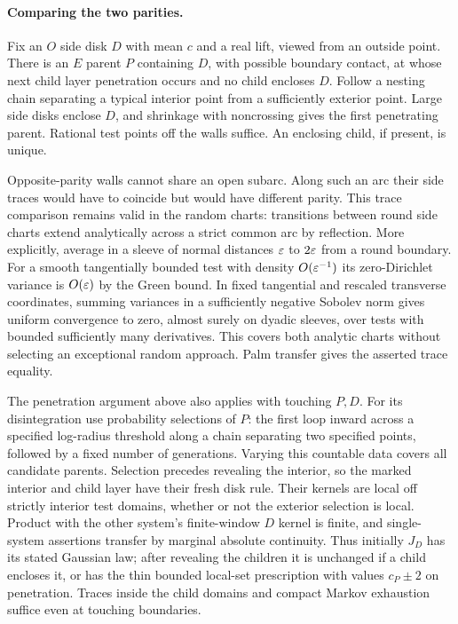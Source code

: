 \paragraph{Comparing the two parities.}
Fix an $O$ side disk $D$ with mean $c$ and a real lift, viewed from an outside point.  There is an $E$ parent $P$ containing $D$, with possible boundary contact, at whose next child layer penetration occurs and no child encloses $D$.  Follow a nesting chain separating a typical interior point from a sufficiently exterior point.  Large side disks enclose $D$, and shrinkage with noncrossing gives the first penetrating parent.  Rational test points off the walls suffice.  An enclosing child, if present, is unique.

Opposite-parity walls cannot share an open subarc.  Along such an arc their side traces would have to coincide but would have different parity.  This trace comparison remains valid in the random charts: transitions between round side charts extend analytically across a strict common arc by reflection.  More explicitly, average in a sleeve of normal distances $\varepsilon$ to $2\varepsilon$ from a round boundary.  For a smooth tangentially bounded test with density $O(\varepsilon^{-1})$ its zero-Dirichlet variance is $O(\varepsilon)$ by the Green bound.  In fixed tangential and rescaled transverse coordinates, summing variances in a sufficiently negative Sobolev norm gives uniform convergence to zero, almost surely on dyadic sleeves, over tests with bounded sufficiently many derivatives.  This covers both analytic charts without selecting an exceptional random approach.  Palm transfer gives the asserted trace equality.

The penetration argument above also applies with touching $P,D$.  For its disintegration use probability selections of $P$: the first loop inward across a specified log-radius threshold along a chain separating two specified points, followed by a fixed number of generations.  Varying this countable data covers all candidate parents.  Selection precedes revealing the interior, so the marked interior and child layer have their fresh disk rule.  Their kernels are local off strictly interior test domains, whether or not the exterior selection is local.  Product with the other system's finite-window $D$ kernel is finite, and single-system assertions transfer by marginal absolute continuity.  Thus initially $J_D$ has its stated Gaussian law; after revealing the children it is unchanged if a child encloses it, or has the thin bounded local-set prescription with values $c_P\pm2$ on penetration.  Traces inside the child domains and compact Markov exhaustion suffice even at touching boundaries.

